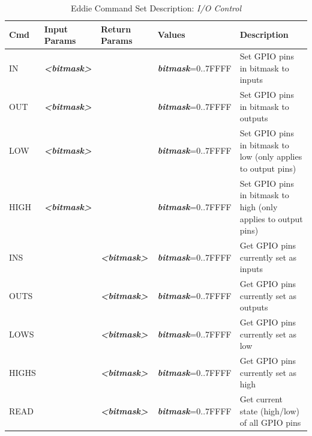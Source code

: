 \begin{table}[H]
\caption{Eddie Command Set Description: \textit{I/O Control}}
\label{tab:eddie_commands}
\begin{tabular}{|p{3em}|p{4.5em}|p{4.5em}|p{7.5em}|p{14em}|}
\hline
\textbf{\large Cmd} & \textbf{\large Input Params} & \textbf{\large Return Params} & \textbf{\large Values} & \textbf{\large Description} \\ \hline \hline
IN & \textit{\textbf{<bitmask>}} &  & \textit{\textbf{bitmask}}=0..7FFFF & Set GPIO pins in bitmask to inputs \\ \hline
OUT & \textit{\textbf{<bitmask>}} &  & \textit{\textbf{bitmask}}=0..7FFFF & Set GPIO pins in bitmask to outputs \\ \hline
LOW & \textit{\textbf{<bitmask>}} &  & \textit{\textbf{bitmask}}=0..7FFFF & Set GPIO pins in bitmask to low (only applies to output pins) \\ \hline
HIGH & \textit{\textbf{<bitmask>}} &  & \textit{\textbf{bitmask}}=0..7FFFF & Set GPIO pins in bitmask to high (only applies to output pins) \\ \hline
INS & & \textit{\textbf{<bitmask>}} & \textit{\textbf{bitmask}}=0..7FFFF & Get GPIO pins currently set as inputs \\ \hline
OUTS & & \textit{\textbf{<bitmask>}} & \textit{\textbf{bitmask}}=0..7FFFF & Get GPIO pins currently set as outputs \\ \hline
LOWS & & \textit{\textbf{<bitmask>}} & \textit{\textbf{bitmask}}=0..7FFFF & Get GPIO pins currently set as low \\ \hline
HIGHS & & \textit{\textbf{<bitmask>}} & \textit{\textbf{bitmask}}=0..7FFFF & Get GPIO pins currently set as high \\ \hline
READ & & \textit{\textbf{<bitmask>}} & \textit{\textbf{bitmask}}=0..7FFFF & Get current state (high/low) of all GPIO pins \\ \hline
\end{tabular}
\end{table}

